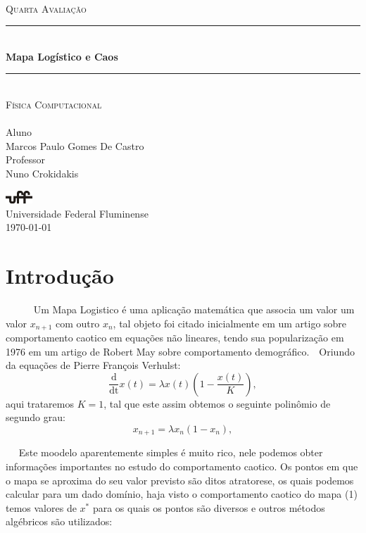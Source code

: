 \documentclass[pdftex,12pt,a4paper]{article}
\newcommand{\HRule}{\rule{\linewidth}{0.3mm}}
\begin{document}
\begin{titlepage}
\begin{center}

~\\[5.0cm]
\textsc{\large Quarta Avaliação}\\
\HRule \\[0.4cm]
{ \huge \bfseries Mapa Logístico e Caos \\[0.4cm] }
\HRule \\[0.5cm]
\textsc{\Large Física Computacional}\\
~\\[3.5cm]
\noindent
\small Aluno\\
\large \textsc Marcos Paulo Gomes De Castro\\[0.2cm]
\small Professor\\
\large \textsc Nuno Crokidakis\\[0.2 cm]
\vfill

\includegraphics[width=1.0cm]{logo}\\

\textsc Universidade Federal Fluminense\\ 
{\normalsize \today}

\end{center}
\end{titlepage}

\section*{Introdução}
 ~~~~~ Um Mapa Logistico é uma aplicação matemática que associa um valor um valor $x_{n+1}$ com outro $x_{n}$, tal objeto foi citado inicialmente em um artigo sobre comportamento caotico em equações não lineares, tendo sua popularização em 1976 em um artigo de  Robert May sobre comportamento demográfico.\
~Oriundo da equações de Pierre François Verhulst:
\begin{equation}
\mathrm{\frac{d}{dt}}x(t) = \lambda x(t)\left(1 - \frac{x(t)}{K}\right),\label{eq:diferencial}
\end{equation}
aqui trataremos $K = 1$, tal que este assim obtemos o seguinte polinômio de segundo grau:
\begin{equation}
x_{n+1} = \lambda x_n(1-x_n),\label{eq:map}
\end{equation}

~~ Este moodelo aparentemente simples é muito rico, nele podemos obter informações importantes  no estudo do comportamento caotico. Os pontos em que o mapa se aproxima do seu valor previsto são ditos atratorese, os quais podemos calcular para um dado domínio, haja visto o comportamento caotico do mapa (1) temos valores de $x^*$ para os quais os pontos são diversos e outros métodos algébricos são utilizados:
\end{document}
